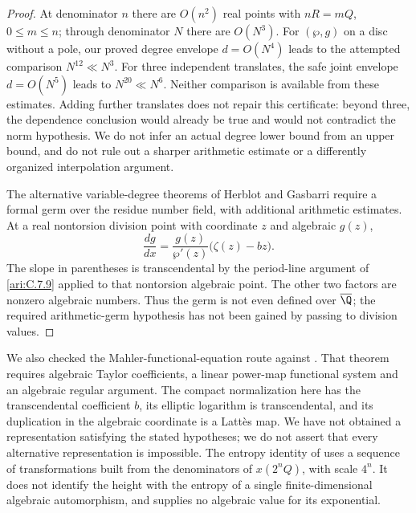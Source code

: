 \begin{proof}
At denominator $n$ there are $O(n^2)$ real points with
$nR=mQ$, $0\leq m\leq n$; through denominator $N$ there are
$O(N^3)$.  For $(\wp,g)$ on a disc without a pole, our proved
degree envelope $d=O(N^4)$ leads to the attempted comparison
$N^{12}\ll N^3$.  For three independent translates, the
safe joint envelope $d=O(N^5)$ leads to
$N^{20}\ll N^6$.  Neither comparison is available from
these estimates.  Adding further translates does not repair
this certificate: beyond three, the dependence conclusion
would already be true and would not contradict the norm
hypothesis.  We do not infer an actual degree lower bound
from an upper bound, and do not rule out a sharper arithmetic
estimate or a differently organized interpolation argument.

The alternative variable-degree theorems of Herblot and
Gasbarri require a formal germ over the residue number field,
with additional arithmetic estimates.  At a real nontorsion
division point with coordinate $z$ and algebraic $g(z)$,
\[
 \frac{dg}{dx}=\frac{g(z)}{\wp'(z)}
                         \bigl(\zeta(z)-bz\bigr).
\]
The slope in parentheses is transcendental by the period-line
argument of \ref{ari:C.7.9} applied to that nontorsion algebraic point.
The other two factors are nonzero algebraic numbers.
Thus the germ is not even defined over $\overline\Q$;
the required arithmetic-germ hypothesis has not been gained
by passing to division values.
\end{proof}

We also checked the Mahler-functional-equation route against
\citet[Theorem 1.1 and system (1.2)]{adamczewski2017mahler}.
That theorem requires algebraic Taylor coefficients, a linear
power-map functional system and an algebraic regular argument.
The compact normalization here has the transcendental coefficient
$b$, its elliptic logarithm is transcendental, and its duplication
in the algebraic coordinate is a Latt\`es map.  We have not obtained
a representation satisfying the stated hypotheses; we do not
assert that every alternative representation is impossible.
The entropy identity of
\citet[Theorem 5.1]{einsiedler2001entropy} uses a sequence of
transformations built from the denominators of $x(2^nQ)$,
with scale $4^n$.  It does not identify the height with the
entropy of a single finite-dimensional algebraic automorphism,
and supplies no algebraic value for its exponential.

